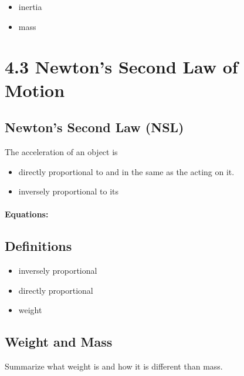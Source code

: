 \documentclass[10pt]{exam}
\begin{document}
\begin{itemize}
  \item inertia
  \item mass
\end{itemize}



\section*{4.3 Newton's Second Law of Motion}

\begin{Sbox}
  \begin{minipage}{6in}
    \subsection*{Newton's Second Law (NSL)}

    The acceleration of an object is
    \begin{itemize}
      \item directly proportional to and in the same \fillin[direction][10em] as the  acting on it.
      \item inversely proportional to its \fillin[mass][5em]
    \end{itemize}
    \paragraph{Equations:}\hfill
    \vspace{3em}
  \end{minipage}
\end{Sbox}

\shadowbox{\TheSbox}

\subsection*{Definitions}

\begin{itemize}
  \item inversely proportional
  \item directly proportional
  \item weight
\end{itemize}

\subsection*{Weight and Mass}
Summarize what weight is and how it is different than mass.
\end{document}
